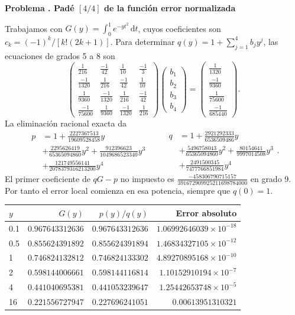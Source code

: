 \documentclass[11pt,a4paper]{article}
\newcommand{\dd}{\,\mathrm d}
\theoremstyle{definition}
\newcounter{problema}
\newenvironment{resuelto}[1]{\refstepcounter{problema}\par\medskip\Needspace{6\baselineskip}\textbf{Problema \theproblema. #1}\par}{\par\medskip}
\begin{document}
\begin{resuelto}{Padé $[4/4]$ de la función error normalizada}
Trabajamos con $G(y)=\int_0^1e^{-yt^2}\dd t$, cuyos coeficientes son $c_k=(-1)^k/[k!(2k+1)]$. Para determinar $q(y)=1+\sum_{j=1}^{4}b_jy^j$, las ecuaciones de grados 5 a 8 son
\[
\begin{pmatrix}\frac{1}{216}&\frac{-1}{42}&\frac{1}{10}&\frac{-1}{3}\\\frac{-1}{1320}&\frac{1}{216}&\frac{-1}{42}&\frac{1}{10}\\\frac{1}{9360}&\frac{-1}{1320}&\frac{1}{216}&\frac{-1}{42}\\\frac{-1}{75600}&\frac{1}{9360}&\frac{-1}{1320}&\frac{1}{216}\end{pmatrix}
\begin{pmatrix}b_{1}\\b_{2}\\b_{3}\\b_{4}\end{pmatrix}
=\begin{pmatrix}\frac{1}{1320}\\\frac{-1}{9360}\\\frac{1}{75600}\\\frac{-1}{685440}\end{pmatrix}.
\]
La eliminación racional exacta da
\[
\begin{aligned}p&=1+\frac{2227367513}{19609528458}y\\&+\frac{2295626419}{65365094860}y^{2}+\frac{912396623}{1049686523340}y^{3}\\&+\frac{121749556141}{2078379316213200}y^{4}\end{aligned}
\qquad \begin{aligned}q&=1+\frac{2921292333}{6536509486}y\\&+\frac{5496758043}{65365094860}y^{2}+\frac{80154641}{9997014508}y^{3}\\&+\frac{2491500345}{7477766851984}y^{4}\end{aligned}.
\]
El primer coeficiente de $qG-p$ no impuesto es $\frac{-458306790715157}{391672909925211698784000}$ en grado 9. Por tanto el error local comienza en esa potencia, siempre que $q(0)=1$.

\begin{center}\small\begin{tabular}{lrrr}
\toprule
$y$ & $G(y)$ & $p(y)/q(y)$ & Error absoluto\\\midrule
0.1 & $0.967643312636$ & $0.967643312636$ & $1.06992646039\times10^{-18}$\\
0.5 & $0.855624391892$ & $0.855624391894$ & $1.46834327105\times10^{-12}$\\
1 & $0.746824132812$ & $0.746824133302$ & $4.89270895168\times10^{-10}$\\
2 & $0.598144006661$ & $0.598144116814$ & $1.10152910194\times10^{-7}$\\
4 & $0.441040695381$ & $0.441053239647$ & $1.25442653748\times10^{-5}$\\
16 & $0.221556727947$ & $0.227696241051$ & $0.00613951310321$\\
\bottomrule\end{tabular}\end{center}


\end{resuelto}
\end{document}
